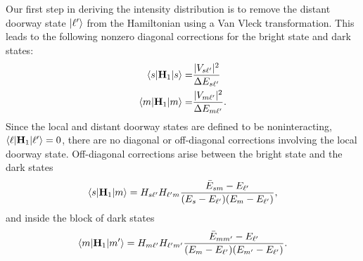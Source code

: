 \documentclass[12pt]{mitthesis}
\begin{document}
Our first step in deriving the intensity distribution is to remove the
distant doorway state $\mathinner{|{\ell'}\rangle}$ from the Hamiltonian using a Van Vleck
transformation.  This leads to the following nonzero diagonal
corrections for the bright state and dark states:
\begin{align}
  \mathinner{\langle{s|\mathbf{H}_1|s}\rangle} =&
    \frac{\lvert V_{s\ell'} \rvert^2}{\Delta E_{s\ell'}}\\
  \mathinner{\langle{m|\mathbf{H}_1|m}\rangle} =&
    \frac{\lvert V_{m\ell'} \rvert^2}{\Delta E_{m\ell'}}.
\end{align}
Since the local and distant doorway states are defined to be
noninteracting, $\mathinner{\langle{\ell|\mathbf{H}_1|\ell'}\rangle} = 0$, there are no
diagonal or off-diagonal corrections involving the local doorway
state.  Off-diagonal corrections arise between the bright state and
the dark states
\begin{equation}
  \mathinner{\langle{s|\mathbf{H}_1|m}\rangle} = H_{s\ell'} H_{\ell' m}
    \frac{\bar{E}_{sm} - E_{\ell'}}{(E_s - E_{\ell'})(E_m - E_{\ell'})},
\end{equation}
and inside the block of dark states
\begin{equation}
  \mathinner{\langle{m|\mathbf{H}_1|m'}\rangle} = H_{m \ell'} H_{\ell' m'}
    \frac{\bar{E}_{mm'} - E_{\ell'}}{(E_m - E_{\ell'})(E_{m'} - E_{\ell'})}.
\end{equation}
\end{document}
